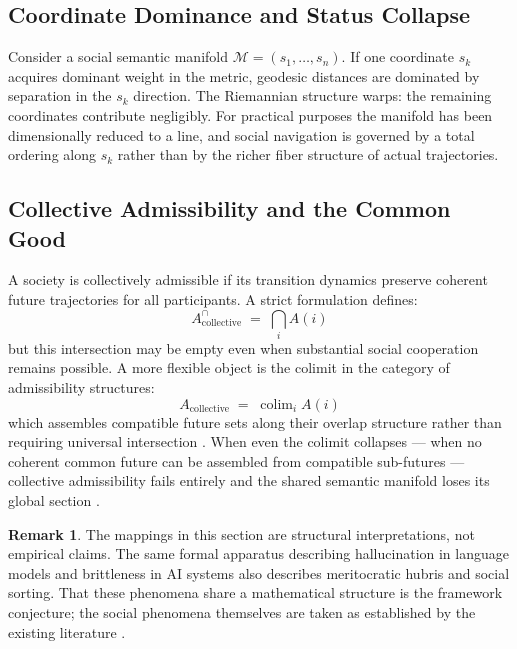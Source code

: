 \documentclass[12pt, a4paper]{article}
\theoremstyle{rsvpstyle}
\theoremstyle{definition}
\newtheorem{remark}[theorem]{Remark}
\newcommand{\OpMan}{\mathcal{M}}
\newcommand{\AF}[1]{A(#1)}
\begin{document}
\subsection{Coordinate Dominance and Status Collapse}

Consider a social semantic manifold $\OpMan = (s_1, \ldots, s_n)$. If one
coordinate $s_k$ acquires dominant weight in the metric, geodesic distances
are dominated by separation in the $s_k$ direction. The Riemannian structure
warps: the remaining coordinates contribute negligibly. For practical purposes
the manifold has been dimensionally reduced to a line, and social navigation
is governed by a total ordering along $s_k$ rather than by the richer fiber
structure of actual trajectories.

\subsection{Collective Admissibility and the Common Good}

A society is collectively admissible if its transition dynamics preserve
coherent future trajectories for all participants. A strict formulation defines:
\begin{equation}
  A_{\mathrm{collective}}^{\cap} \;=\; \bigcap_i \AF{i}
\end{equation}
but this intersection may be empty even when substantial social cooperation
remains possible. A more flexible object is the colimit in the category of
admissibility structures:
\begin{equation}
  A_{\mathrm{collective}} \;=\; \operatorname{colim}_i \AF{i}
\end{equation}
which assembles compatible future sets along their overlap structure rather than
requiring universal intersection \citep{MacLane1998}. When even the colimit
collapses --- when no coherent common future can be assembled from compatible
sub-futures --- collective admissibility fails entirely and the shared semantic
manifold loses its global section \citep{Sandel2020}.

\begin{remark}
The mappings in this section are structural interpretations, not
empirical claims. The same formal apparatus describing hallucination in language
models and brittleness in AI systems also describes meritocratic hubris and
social sorting. That these phenomena share a mathematical structure is the
framework conjecture; the social phenomena themselves are taken as established
by the existing literature \citep{Sandel2020}.
\end{remark}
\end{document}
